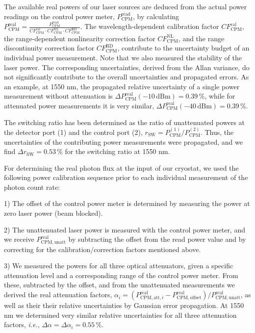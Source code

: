 \documentclass[aip,apl,showpacs,showkeys,preprint,superscriptaddress,preprintnumbers,amsmath,amssymb]{revtex4-1}
\begin{document}
\begin{bibunit}
The available real powers of our laser sources are deduced from the actual power readings on the control power meter, $P^\mathrm{read}_\mathrm{CPM}$, by calculating $P^\mathrm{real}_\mathrm{CPM}=\frac{P^\mathrm{read}_\mathrm{CPM}}{CF^\mathrm{cal}_\mathrm{CPM}\cdot CF^\mathrm{NL}_\mathrm{CPM}\cdot CF^\mathrm{RD}_\mathrm{CPM}}$. The wavelength-dependent calibration factor $CF^\mathrm{cal}_\mathrm{CPM}$, the range-dependent nonlinearity correction factor $CF^\mathrm{NL}_\mathrm{CPM}$, and the range discontinuity correction factor $CF^\mathrm{RD}_\mathrm{CPM}$, contribute to the uncertainty budget of an individual power measurement\cite{Vayshenker2006}. Note that we also measured the stability of the laser power. The corresponding uncertainties, derived from the Allan variance, do not significantly contribute to the overall uncertainties and propagated errors. As an example, at 1550 nm, the propagated relative uncertainty of a single power measurement without attenuation is $\Delta P^\mathrm{real}_\mathrm{CPM}(-10\,\mathrm{dBm})=0.39\,\%$, while for attenuated power measurements it is very similar, $\Delta P^\mathrm{real}_\mathrm{CPM}(-40\,\mathrm{dBm})=0.39\,\%$.

The switching ratio has been determined as the ratio of unattenuated powers at the detector port (1) and the control port (2), $r_\mathrm{SW}=P^\mathrm{(1)}_\mathrm{CPM}/P^\mathrm{(2)}_\mathrm{CPM}$. Thus, the uncertainties of the contributing power measurements were propagated, and we find $\Delta { r_\mathrm{SW}}=0.53\,\%$ for the switching ratio at 1550 nm.

For determining the real photon flux at the input of our cryostat, we used the following power calibration sequence prior to each individual measurement of the photon count rate:

1) The offset of the control power meter is determined by measuring the power at zero laser power (beam blocked). 

2) The unattenuated laser power is measured with the control power meter, and we receive $P^\mathrm{real}_\mathrm{CPM,unatt}$ by subtracting the offset from the read power value and by correcting for the calibration/correction factors mentioned above.

3) We measured the powers for all three optical attenuators, given a specific attenuation level and a corresponding range of the control power meter. From these, subtracted by the offset, and from the unattenuated measurements we derived the real attenuation factors, $\alpha_i=\left(P^\mathrm{real}_{\mathrm{CPM,att},i}-P^\mathrm{real}_ {\mathrm{CPM,offset}}\right)/P^\mathrm{real}_\mathrm{CPM,unatt}$, as well as their their relative uncertainties by Gaussian error propagation. At 1550 nm we determined very similar relative uncertainties for all three attenuation factors, \textit{i.e.}, $\Delta \alpha=\Delta \alpha_{i}=0.55\,\%$.


\end{bibunit}
\end{document}
